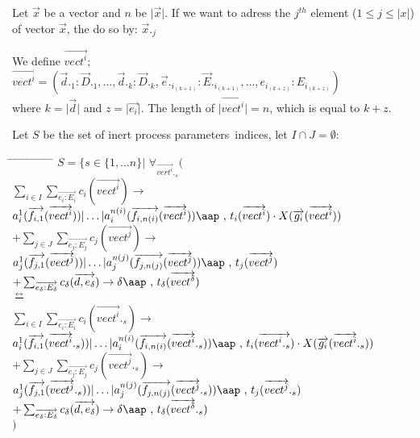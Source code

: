 \documentclass[a4paper,10pt]{article}
\theoremstyle{plain}
\theoremstyle{definition}
\newcommand{\ovr}{\overrightarrow}
\newcommand{\pps}{process parameters}
\newcommand{\bisim}{\frac{\leftrightarrow}{}}
\newcommand{\tab}{\hspace*{5.mm} \= \hspace*{5.mm} \= \hspace*{5.mm} \= \hspace*{5.mm} \= \hspace*{5.mm} \= \hspace*{5.mm}  \= \hspace*{5.mm}  \= \hspace*{5.mm}  \= \hspace*{5.mm} \= \hspace*{5.mm} \= \hspace*{5.mm}  \= \hspace*{5.mm}  \= \hspace*{5.mm}\kill}
\newcommand{\at}[1]{\mbox{\aap ,} #1}
\begin{document}
\begin{defn}
Let $\ovr{x}$ be a vector and  $n$ be $\vert \ovr{x} \vert$. If we want to adress the $j^{th}$ element ($ 1 \leq j \leq \vert x \vert $) of vector $\ovr{x}$, the do so by:
$\ovr{x}._j$
\end{defn}

\begin{defn}
We define $\ovr{vect^i}$;\\
$\ovr{vect^i} = 
( \ovr{d}._1:\ovr{D}._1 , \ldots , \ovr{d}._k: \ovr{D}._k , \ovr{e}._{i_{(k+1)}}:\ovr{E}._{i_{(k+1)}} , \ldots , e_{i_{(k+z)}}:E_{i_{(k+z)}} ) $\\
where $k = \vert \ovr{d} \vert$ and $z = \vert \ovr{e_i} \vert$. The length of $ \vert \ovr{vect^i} \vert = n$, which is equal to $k + z$.
\end{defn}

\begin{defn} Let $S$ be the set of inert \pps\ indices, let $I \cap J = \emptyset $:
\begin{tabbing}
\tab
$S = \lbrace s \in \lbrace 1, \ldots n \rbrace \vert$ 
$\forall_{\ovr{vert^i}._s}($  \\
\> \>$\sum_{i \in I} \sum_{\ovr{e_i:E_i}} c_i ( \ovr{vect^i} ) \rightarrow $
$ a_i^1 (\ovr{f_{i,1}}(\ovr{vect^i})) \vert \ldots \vert a_i^{n(i)}(\ovr{f_{i,n(i)}}(\ovr{vect^i})) \at \text{ } t_i(\ovr{vect^i})  \cdot X(\ovr{g_i}(\ovr{vect^i}))
$ \\
\> \> $+ \sum_{j \in J} \sum_{\ovr{e_j:E_j}} c_j ( \ovr{vect^j} ) \rightarrow $
$ a_j^1 (\ovr{f_{j,1}}(\ovr{vect^j})) \vert \ldots \vert a_j^{n(j)}(\ovr{f_{j,n(j)}}(\ovr{vect^j})) \at \text{ } t_j(\ovr{vect^j})
$ \\
\> \> $ + \sum_{\ovr{e_\delta:E_\delta}} c_\delta ( \ovr{d, e_\delta}) \rightarrow 
\delta \at \text{ } t_\delta(\ovr{vect^{\delta}})$ \\

\> $\bisim$ \\

\> \>$\sum_{i \in I} \sum_{\ovr{e_i:E_i}} c_i ( \ovr{vect^i}._s ) \rightarrow $
$ a_i^1 (\ovr{f_{i,1}}(\ovr{vect^i}._s)) \vert \ldots \vert a_i^{n(i)}(\ovr{f_{i,n(i)}}(\ovr{vect^i}._s)) \at \text{ } t_i(\ovr{vect^i._s})  \cdot X(\ovr{g_i}(\ovr{vect^i}._s))
$ \\
\> \> $+ \sum_{j \in J} \sum_{\ovr{e_j:E_j}} c_j ( \ovr{vect^j}._s ) \rightarrow $
$ a_j^1 (\ovr{f_{j,1}}(\ovr{vect^j}._s)) \vert \ldots \vert a_j^{n(j)}(\ovr{f_{j,n(j)}}(\ovr{vect^j}._s)) \at \text{ } t_j(\ovr{vect^j}._s)
$ \\
\> \> $ + \sum_{\ovr{e_\delta:E_\delta}} c_\delta ( \ovr{d, e_\delta}) \rightarrow 
\delta \at \text{ } t_\delta(\ovr{vect^{\delta}}._s)$\\
$)$ \\
\end{tabbing}
\end{defn}
\end{document}
